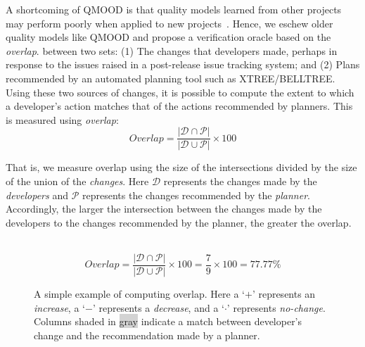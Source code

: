 \documentclass[10pt, journal, compsoc]{IEEEtran}
\begin{document}
A shortcoming of QMOOD is that quality models learned from other projects may perform poorly when applied to new projects~\cite{localvsglobal}. Hence,  we eschew older quality models like QMOOD and propose a verification oracle based on the  {\em overlap}.
between two sets: (1) The changes that developers made, perhaps in response to the issues raised in a post-release issue tracking system; and (2) Plans recommended by an automated planning tool such as XTREE/BELLTREE.
Using these two sources of changes, it is possible to compute the extent to which a developer's action matches that of the actions recommended by planners. This is measured using \textit{overlap}:
\begin{equation}
\mathit{Overlap} = \frac{|\mathcal{D} \cap \mathcal{P}|}{|\mathcal{D} \cup \mathcal{P}|}\times 100  
\end{equation}


That is, we measure  overlap using the size of the intersections divided by the size of the union of the \textit{changes}. Here $\mathcal{D}$ represents the changes made by the \textit{developers} and $\mathcal{P}$ represents the changes recommended by the \textit{planner}. Accordingly, the larger the intersection between the changes made by the developers to the changes recommended by the planner, the greater the overlap. 

\begin{figure}[!b]
\centering
{}\\
\[
Overlap = \frac{|\mathcal{D} \cap \mathcal{P}|}{|\mathcal{D} \cup \mathcal{P}|}\times 100 = \frac{7}{9}\times100 = 77.77\%
\]
\caption{A simple example of computing overlap. Here a `$+$' represents an \textit{increase}, a `$-$' represents a \textit{decrease}, and a `$\cdot$' represents \textit{no-change}. Columns shaded in \colorbox{lightgray}{gray} indicate a match between developer's change and the recommendation made by a planner.}
\label{fig:overlap_example}
\end{figure}
\end{document}
